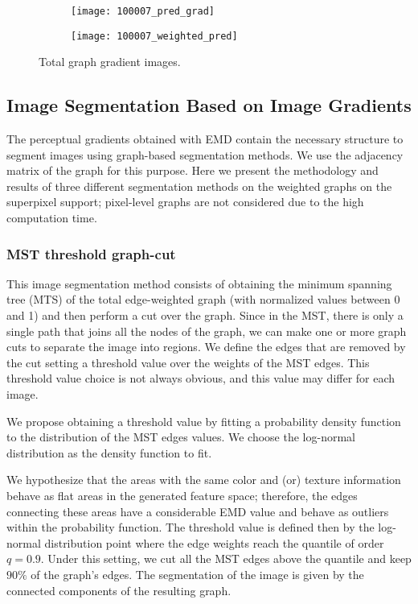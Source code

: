 \begin{figure}[!ht]
    \centering
    \begin{subfigure}[b]{0.49\textwidth}
    	\texttt{[image: 100007\_pred\_grad]} 
    \end{subfigure}      
    \begin{subfigure}[b]{0.49\textwidth}
        \texttt{[image: 100007\_weighted\_pred]}
    \end{subfigure}    
	\caption{Total graph gradient images.}\label{fig:total_graph_gradient_pixel_superpixel}    
\end{figure}

\subsection{Image Segmentation Based on Image Gradients}
The perceptual gradients obtained with EMD contain the necessary structure to segment images using graph-based segmentation methods. We use the adjacency matrix of the graph for this purpose. Here we present the methodology and results of three different segmentation methods on the weighted graphs on the superpixel support; pixel-level graphs are not considered due to the high computation time. 

\subsubsection{MST threshold graph-cut}

This image segmentation method consists of obtaining the minimum spanning tree (MTS) of the total edge-weighted graph (with normalized values between 0 and 1) and then perform a cut over the graph. Since in the MST, there is only a single path that joins all the nodes of the graph, we can make one or more graph cuts to separate the image into regions. We define the edges that are removed by the cut setting a threshold value over the weights of the MST edges. This threshold value choice is not always obvious, and this value may differ for each image.

We propose obtaining a threshold value by fitting a probability density function to the distribution of the MST edges values. We choose the log-normal distribution as the density function to fit. 

We hypothesize that the areas with the same color and (or) texture information behave as flat areas in the generated feature space; therefore, the edges connecting these areas have a considerable EMD value and behave as outliers within the probability function. The threshold value is defined then by the log-normal distribution point where the edge weights reach the quantile of order $q = 0.9$. Under this setting, we cut all the MST edges above the quantile and keep $90\%$ of the graph's edges. The segmentation of the image is given by the connected components of the resulting graph.

